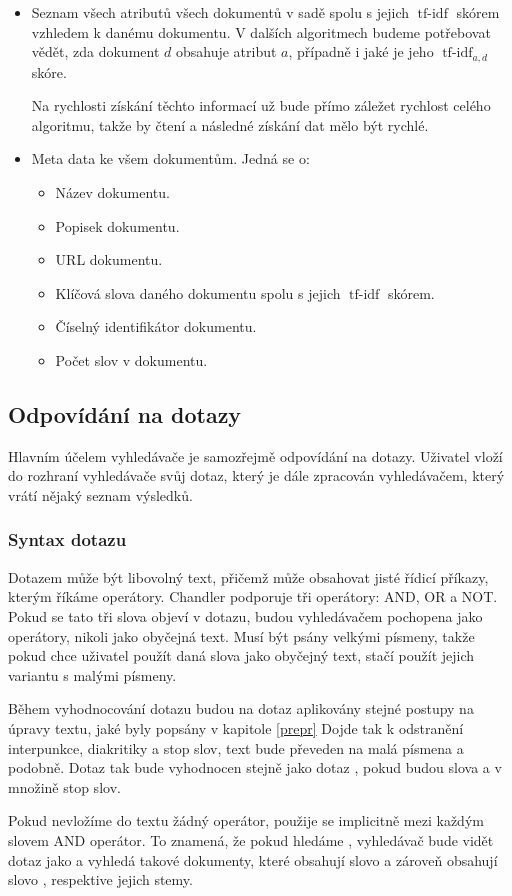 \documentclass[12pt]{article}
\newcommand{\name}{Chandler}
\newcommand{\ssection}[1]{\subsection{#1}}
\newcommand{\sssection}[1]{\subsubsection{#1}}
\DeclareMathOperator{\tfidf}{tf-idf}
\begin{document}
\begin{itemize}
\item Seznam všech atributů všech dokumentů v sadě spolu s jejich $\tfidf$ skórem vzhledem k danému dokumentu. V dalších algoritmech budeme potřebovat vědět, zda dokument $d$ obsahuje atribut $a$, případně i jaké je jeho $\tfidf_{a, d}$ skóre. 

Na rychlosti získání těchto informací už bude přímo záležet rychlost celého algoritmu, takže by čtení a následné získání dat mělo být rychlé. 

\item Meta data ke všem dokumentům. Jedná se o:
	\begin{itemize}
	\item Název dokumentu. 
	\item Popisek dokumentu.
	\item URL dokumentu. 
	\item Klíčová slova daného dokumentu spolu s jejich $\tfidf$ skórem. 
	\item Číselný identifikátor dokumentu.
	\item Počet slov v dokumentu. 
	\end{itemize}
\end{itemize}


\ssection{Odpovídání na dotazy}
Hlavním účelem vyhledávače je samozřejmě odpovídání na dotazy. Uživatel vloží do rozhraní vyhledávače svůj dotaz, který je dále zpracován vyhledávačem, který vrátí nějaký seznam výsledků. 

\sssection{Syntax dotazu}
Dotazem může být libovolný text, přičemž může obsahovat jisté řídicí příkazy, kterým říkáme operátory. \name{} podporuje tři operátory: AND, OR a NOT. Pokud se tato tři slova objeví v dotazu, budou vyhledávačem pochopena jako operátory, nikoli jako obyčejná text. Musí být psány velkými písmeny, takže pokud chce uživatel použít daná slova jako obyčejný text, stačí použít jejich variantu s malými písmeny. 

Během vyhodnocování dotazu budou na dotaz aplikovány stejné postupy na úpravy textu, jaké byly popsány v kapitole \ref{prepr} Dojde tak k odstranění interpunkce, diakritiky a stop slov, text bude převeden na malá písmena a podobně. Dotaz  tak bude vyhodnocen stejně jako dotaz , pokud budou slova  a  v množině stop slov. 

Pokud nevložíme do textu žádný operátor, použije se implicitně mezi každým slovem AND operátor. To znamená, že pokud hledáme , vyhledávač bude vidět dotaz jako  a vyhledá takové dokumenty, které obsahují slovo  a zároveň obsahují slovo , respektive jejich stemy. 
\end{document}
